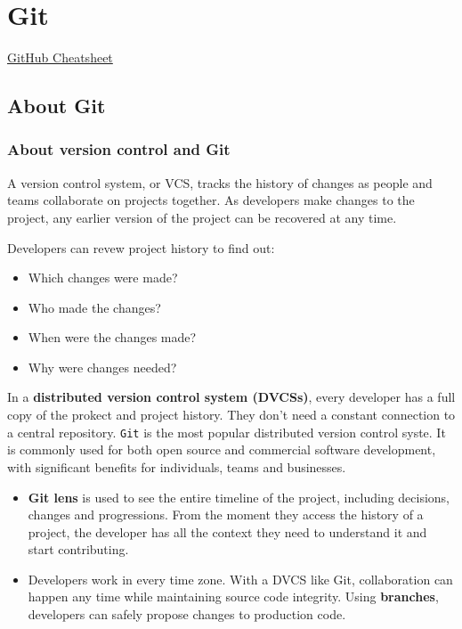 
\chapter{Git}

\href{https://training.github.com/downloads/github-git-cheat-sheet.pdf}{GitHub Cheatsheet}

\section{About Git}

\subsection{About version control and Git}

\begin{definitionblock}
    A version control system, or VCS, tracks the history of changes as people and teams collaborate on projects together. As developers make changes to the project, any earlier version of the project can be recovered at any time.
\end{definitionblock}

Developers can revew project history to find out:
\begin{itemize}
    \item Which changes were made?
    \item Who made the changes?
    \item When were the changes made?
    \item Why were changes needed?
\end{itemize}

In a \textbf{distributed version control system (DVCSs)}, every developer has a full copy of the prokect and project history. They don't need a constant connection to a central repository. \texttt{Git} is the most popular distributed version control syste. It is commonly used for both open source and commercial software development, with significant benefits for individuals, teams and businesses. 

\begin{tipsblock}
    \begin{itemize}
        \item \textbf{Git lens} is used to see the entire timeline of the project, including decisions, changes and progressions. From the moment they access the history of a project, the developer has all the context they need to understand it and start contributing.
        \item Developers work in every time zone. With a DVCS like Git, collaboration can happen any time while maintaining source code integrity. Using \textbf{branches}, developers can safely propose changes to production code.
    \end{itemize}
\end{tipsblock}

